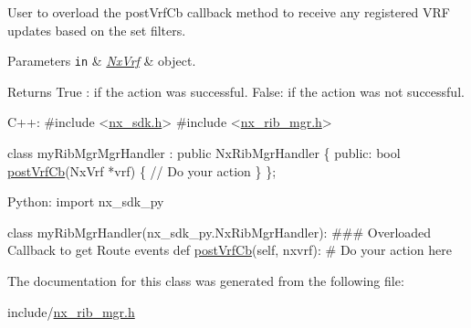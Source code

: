User to overload the post\+Vrf\+Cb callback method to receive any registered V\+RF updates based on the set filters. 
\begin{DoxyParams}[1]{Parameters}
\mbox{\tt in}  & {\em \mbox{\hyperlink{classnxos_1_1_nx_vrf}{Nx\+Vrf}}} & object.\\
\hline
\end{DoxyParams}
\begin{DoxyReturn}{Returns}
True \+: if the action was successful. False\+: if the action was not successful.
\end{DoxyReturn}

\begin{DoxyCode}
C++:
\textcolor{preprocessor}{   #include <\mbox{\hyperlink{nx__sdk_8h}{nx\_sdk.h}}>}
\textcolor{preprocessor}{   #include <\mbox{\hyperlink{nx__rib__mgr_8h}{nx\_rib\_mgr.h}}>}

   \textcolor{keyword}{class }myRibMgrMgrHandler : \textcolor{keyword}{public} NxRibMgrHandler \{
      \textcolor{keyword}{public}:
         \textcolor{keywordtype}{bool} \mbox{\hyperlink{classnxos_1_1_nx_rib_mgr_handler_a2ed5a3ad9c0e55d21e18d88a19419a5e}{postVrfCb}}(NxVrf *vrf) \{
              \textcolor{comment}{// Do your action}
         \}
   \};

Python:
   \textcolor{keyword}{import} nx\_sdk\_py

   \textcolor{keyword}{class }myRibMgrHandler(nx\_sdk\_py.NxRibMgrHandler):
\textcolor{preprocessor}{   ### Overloaded Callback to get Route events}
         def \mbox{\hyperlink{classnxos_1_1_nx_rib_mgr_handler_a2ed5a3ad9c0e55d21e18d88a19419a5e}{postVrfCb}}(self, nxvrf):
\textcolor{preprocessor}{             # Do your action here}
\end{DoxyCode}
 

The documentation for this class was generated from the following file\+:\begin{DoxyCompactItemize}
\item 
include/\mbox{\hyperlink{nx__rib__mgr_8h}{nx\+\_\+rib\+\_\+mgr.\+h}}\end{DoxyCompactItemize}
